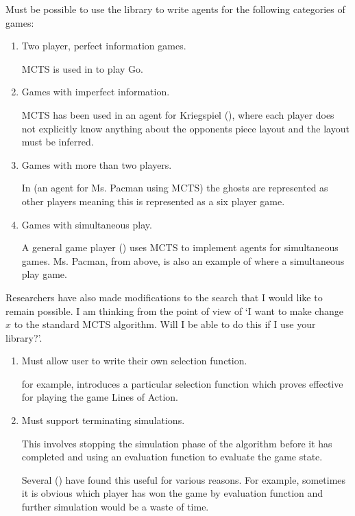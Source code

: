\documentclass[12pt]{article}
\begin{document}
Must be possible to use the library to write agents for the following categories of games:
\begin{enumerate}
\item Two player, perfect information games.\par
MCTS is used in \cite{go} to play Go.

\item Games with imperfect information.\par
MCTS has been used in an agent for Kriegspiel (\cite{war}), where each player does not explicitly know anything about the opponents piece layout and the layout must be inferred.

\item Games with more than two players.\par
In \cite{pacman} (an agent for Ms. Pacman using MCTS) the ghosts are represented as other players meaning this is represented as a six player game.

\item Games with simultaneous play.\par
A general game player (\cite{general}) uses MCTS to implement agents for simultaneous games. Ms. Pacman, from above, is also an example of where a simultaneous play game.

\end{enumerate}

Researchers have also made modifications to the search that I would like to remain possible. I am thinking from the point of view of `I want to make change $x$ to the standard MCTS algorithm. Will I be able to do this if I use your library?'. 


\begin{enumerate}
\item Must allow user to write their own selection function.\par
\cite{mctssolver} for example, introduces a particular selection function which proves effective for playing the game Lines of Action.\par


\item Must support terminating simulations.\par
This involves stopping the simulation phase of the algorithm before it has completed and using an evaluation function to evaluate the game state.\par 
Several (\cite{LOA,pacman}) have found this useful for various reasons. For example, sometimes it is obvious which player has won the game by evaluation function and further simulation would be a waste of time.
\end{enumerate}
\end{document}
